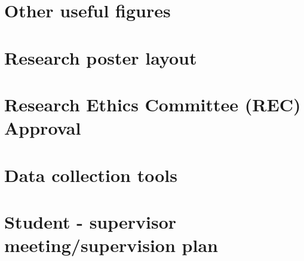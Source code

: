 \chapter{Other useful figures}
\label{App:figures-other}


\chapter{Research poster layout }
\label{App:research-poster-layout}


\chapter{Research Ethics Committee (REC) Approval}
\label{App:REC-approval}




\chapter{Data collection tools }
\label{App:data-collection-tools}


\chapter{Student - supervisor meeting/supervision plan }
\label{App:student-supervisor-meeting-plan }
 



